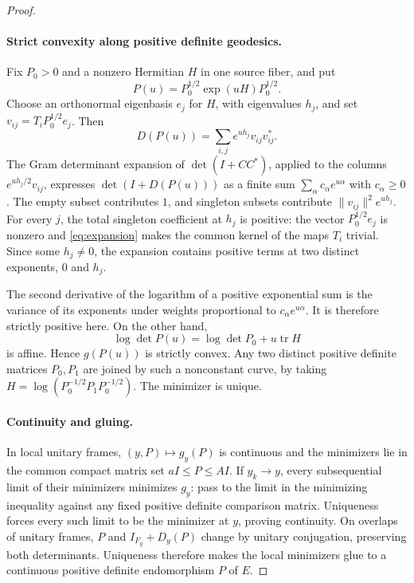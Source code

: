 \begin{proof}
\paragraph{Strict convexity along positive definite geodesics.}
Fix $P_0>0$ and a nonzero Hermitian $H$ in one source fiber, and put
\[
  P(u)=P_0^{1/2}\exp(uH)P_0^{1/2}.
\]
Choose an orthonormal eigenbasis $e_j$ for $H$, with eigenvalues $h_j$,
and set $v_{ij}=T_iP_0^{1/2}e_j$.  Then
\[
  D(P(u))=\sum_{i,j}e^{u h_j}v_{ij}v_{ij}^*.
\]
The Gram determinant expansion of $\det(I+CC^*)$, applied to the columns
$e^{u h_j/2}v_{ij}$, expresses $\det(I+D(P(u)))$ as a finite sum
$\sum_\alpha c_\alpha e^{u\alpha}$ with $c_\alpha\geq0$.  The empty
subset contributes $1$, and singleton subsets contribute
$\|v_{ij}\|^2e^{u h_j}$.  For every $j$, the total singleton coefficient
at $h_j$ is positive: the vector $P_0^{1/2}e_j$ is nonzero and
\eqref{eq:expansion} makes the common kernel of the maps $T_i$ trivial.
Since some $h_j\ne0$, the expansion contains positive terms at two
distinct exponents, $0$ and $h_j$.

The second derivative of the logarithm of a positive exponential sum is
the variance of its exponents under weights proportional to
$c_\alpha e^{u\alpha}$.  It is therefore strictly positive here.  On the
other hand,
\[
  \log\det P(u)=\log\det P_0+u\operatorname{tr}H
\]
is affine.  Hence $g(P(u))$ is strictly convex.  Any two distinct positive
definite matrices $P_0,P_1$ are joined by such a nonconstant curve, by
taking $H=\log(P_0^{-1/2}P_1P_0^{-1/2})$.  The minimizer is unique.

\paragraph{Continuity and gluing.}
In local unitary frames, $(y,P)\mapsto g_y(P)$ is continuous and the
minimizers lie in the common compact matrix set $aI\leq P\leq AI$.
If $y_k\to y$, every subsequential limit of their minimizers minimizes
$g_y$: pass to the limit in the minimizing inequality against any fixed
positive definite comparison matrix.  Uniqueness forces every such
limit to be the minimizer at $y$, proving continuity.  On overlaps of
unitary frames, $P$ and $I_{F_y}+D_y(P)$ change by unitary conjugation,
preserving both determinants.  Uniqueness
therefore makes the local minimizers glue to a continuous positive
definite endomorphism $P$ of $E$.


\end{proof}
